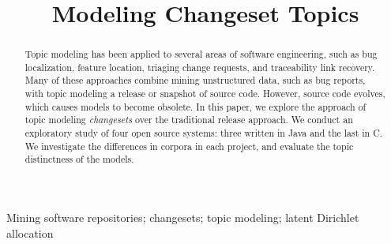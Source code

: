 \documentclass[conference]{IEEEtran}
\begin{document}
\title{Modeling Changeset Topics}
\author{

    \and


    \and

}


\maketitle

\begin{abstract}
Topic modeling has been applied to several areas of software engineering,
such as bug localization, feature location, triaging change requests,
and traceability link recovery.
Many of these approaches combine mining unstructured data, such as bug
reports, with topic modeling a release or snapshot of source code.
However, source code evolves, which causes models to become obsolete.
In this paper, we explore the approach of topic modeling \emph{changesets}
over the traditional release approach.
We conduct an exploratory study of four open source systems:
three written in Java and the last in C.
We investigate the differences in corpora in each project,
and evaluate the topic distinctness of the models.
\end{abstract}

\begin{IEEEkeywords}
Mining software repositories;
changesets;
topic modeling;
latent Dirichlet allocation
\end{IEEEkeywords}
\end{document}
